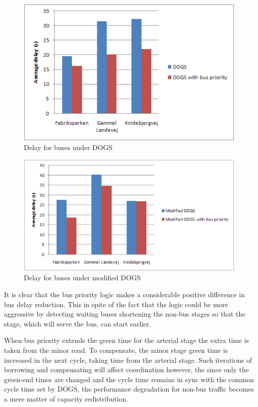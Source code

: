 \begin{figure}[ht]
\begin{center}
\includegraphics[scale=0.30]{delay_bus_dogs.png} 
\end{center}
\caption{Delay for buses under DOGS}
\label{fig:delay_bus_dogs}
\end{figure}

\begin{figure}[ht]
\begin{center}
\includegraphics[scale=0.30]{delay_bus_modified-dogs.png} 
\end{center}
\caption{Delay for buses under modified DOGS}
\label{fig:delay_bus_modified_dogs}
\end{figure}

It is clear that the bus priority logic makes a considerable positive difference in bus delay reduction. This in spite of the fact that the logic could be more aggressive by detecting waiting buses shortening the non-bus stages so that the stage, which will serve the bus, can start earlier.

When bus priority extends the green time for the arterial stage the extra time is taken from the minor road. To compensate, the minor stage green time is increased in the next cycle, taking time from the arterial stage. Such iterations of borrowing and compensating will affect coordination however, the since only the green-end times are changed and the cycle time remains in sync with the common cycle time set by DOGS, the performance degradation for non-bus traffic becomes a mere matter of capacity redistribution.